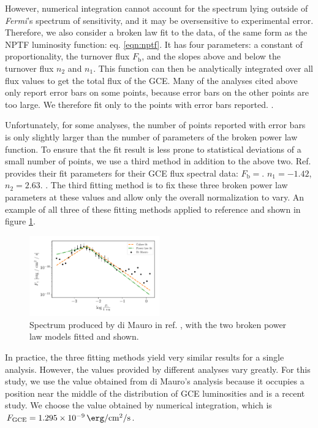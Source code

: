\documentclass[a4paper,11pt]{article}
\newcommand{\comment}[1]{\emph{\color{red}{#1}}}
\begin{document}
However, numerical integration cannot account for the spectrum lying outside of \textit{Fermi}'s spectrum of sensitivity, and it may be oversensitive to experimental error. Therefore, we also consider a broken law fit to the data, of the same form as the NPTF luminosity function: eq. \ref{eqn:nptf}. It has four parameters: a constant of proportionality, the turnover flux $F_\text{b}$, and the slopes above and below the turnover flux $n_2$ and $n_1$. This function can then be analytically integrated over all flux values to get the total flux of the GCE. Many of the analyses cited above only report error bars on some points, because error bars on the other points are too large. We therefore fit only to the points with error bars reported. \comment{Mention the specific range fitted over}.

Unfortunately, for some analyses, the number of points reported with error bars is only slightly larger than the number of parameters of the broken power law function. To ensure that the fit result is less prone to statistical deviations of a small number of points, we use a third method in addition to the above two. Ref. \cite{Calore:2014xka} provides their fit parameters for their GCE flux spectral data: $F_\text{b} = $. $n_1 = -1.42$, $n_2 = 2.63$. \comment{Check for sign errors in the original. Also get the flux they provide.}. The third fitting method is to fix these three broken power law parameters at these values and allow only the overall normalization to vary. An example of all three of these fitting methods applied to reference \cite{DiMauro:2021raz} and shown in figure \ref{fig:di-mauro-example}.

\begin{figure}
    \centering
    \includegraphics[width=0.5\textwidth]{figs/di-mauro-example.pdf}
    \caption{Spectrum produced by di Mauro in ref. \cite{DiMauro:2021raz}, with the two broken power law models fitted and shown.}
    \label{fig:di-mauro-example}
\end{figure}

In practice, the three fitting methods yield very similar results for a single analysis. However, the values provided by different analyses vary greatly. For this study, we use the value obtained from di Mauro's analysis because it occupies a position near the middle of the distribution of GCE luminosities and is a recent study. We choose the value obtained by numerical integration, which is $F_\text{GCE} = \SI{1.295e-9}{\erg\per\centi\meter\squared\per\second}$.
\end{document}
